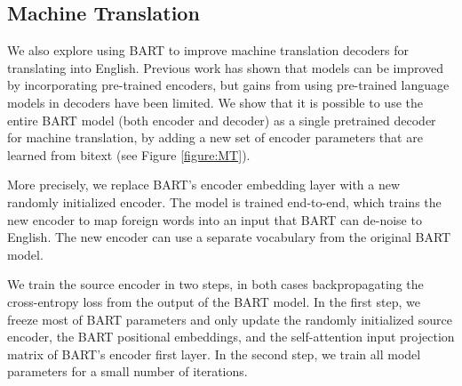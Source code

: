 \documentclass{article} %
\newcommand{\omer}[1]{{\color{blue} [Omer: #1]}}
\begin{document}


\subsection{Machine Translation}
\label{sec:tuning-MT}
We also explore using BART to improve machine translation decoders for translating into English. Previous work  has shown that models can be improved by incorporating pre-trained encoders, but gains from using pre-trained language models in decoders have been limited. We show that it is possible to use the entire BART model (both encoder and decoder) as a single pretrained decoder for machine translation, by adding a new set of encoder parameters that are learned from bitext (see Figure \ref{figure:MT}).

More precisely, we replace BART's encoder embedding layer with a new randomly initialized encoder. The model is trained end-to-end, which trains the new encoder to map foreign words into an input that BART can de-noise to English. The new encoder can use a separate vocabulary from the original BART model.



We train the source encoder in two steps, in both cases backpropagating the cross-entropy loss from the output of the BART model. In the first step, we freeze most of BART parameters and only update the randomly initialized source encoder, the BART positional embeddings, and the self-attention input projection matrix of BART's encoder first layer.
In the second step, we train all model parameters for a small number of iterations. 
\end{document}
